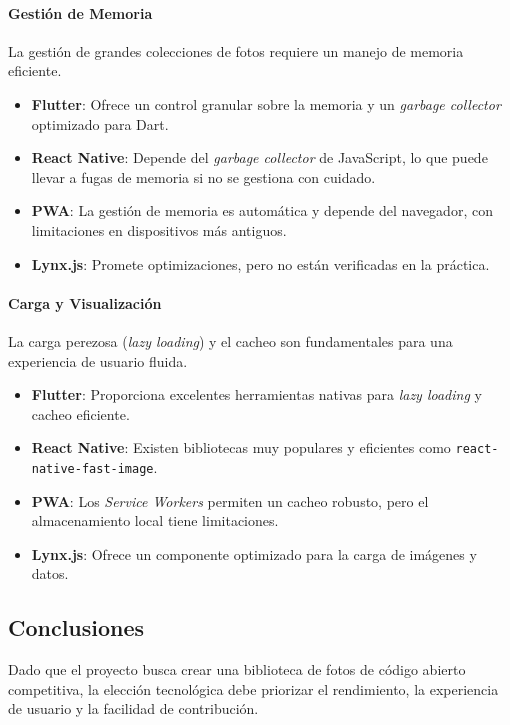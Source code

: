 \paragraph{Gestión de Memoria}
La gestión de grandes colecciones de fotos requiere un manejo de memoria eficiente.
\begin{itemize}
    \item \textbf{Flutter}: Ofrece un control granular sobre la memoria y un \textit{garbage collector} optimizado para Dart.
    \item \textbf{React Native}: Depende del \textit{garbage collector} de JavaScript, lo que puede llevar a fugas de memoria si no se gestiona con cuidado.
    \item \textbf{PWA}: La gestión de memoria es automática y depende del navegador, con limitaciones en dispositivos más antiguos.
    \item \textbf{Lynx.js}: Promete optimizaciones, pero no están verificadas en la práctica.
\end{itemize}

\paragraph{Carga y Visualización}
La carga perezosa (\textit{lazy loading}) y el cacheo son fundamentales para una experiencia de usuario fluida.
\begin{itemize}
    \item \textbf{Flutter}: Proporciona excelentes herramientas nativas para \textit{lazy loading} y cacheo eficiente.
    \item \textbf{React Native}: Existen bibliotecas muy populares y eficientes como \texttt{react-native-fast-image}.
    \item \textbf{PWA}: Los \textit{Service Workers} permiten un cacheo robusto, pero el almacenamiento local tiene limitaciones.
    \item \textbf{Lynx.js}: Ofrece un componente optimizado para la carga de imágenes y datos.
\end{itemize}

\subsection{Conclusiones}

Dado que el proyecto busca crear una biblioteca de fotos de código abierto competitiva, la elección tecnológica debe priorizar el rendimiento, la experiencia de usuario y la facilidad de contribución.

